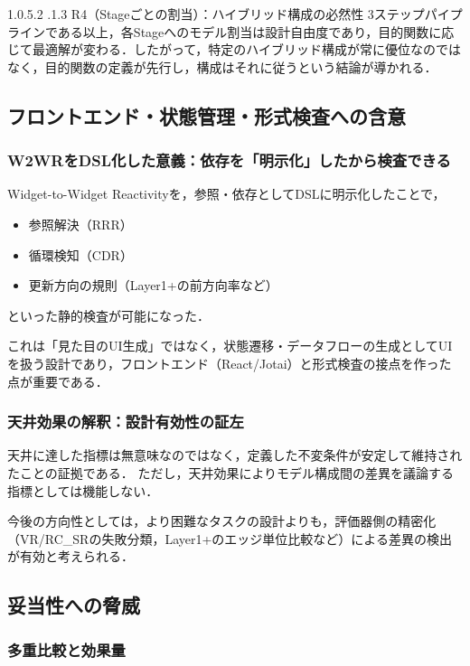 \documentclass[a4paper,10pt]{jarticle}
\makeatletter
\newcommand{\subsubsubsection}{\@startsection{paragraph}{4}{\z@}%
{1.0\Cvs \@plus.5\Cdp \@minus.2\Cdp}%
{.1\Cvs \@plus.3\Cdp}%
{\reset@font\sffamily\normalsize}
}
\makeatother
\begin{document}
\subsubsubsection{R4（Stageごとの割当）：ハイブリッド構成の必然性}
3ステップパイプラインである以上，各Stageへのモデル割当は設計自由度であり，目的関数に応じて最適解が変わる．したがって，特定のハイブリッド構成が常に優位なのではなく，目的関数の定義が先行し，構成はそれに従うという結論が導かれる．

\subsection{フロントエンド・状態管理・形式検査への含意}
\label{subsec:disc_frontend}

\subsubsection{W2WRをDSL化した意義：依存を「明示化」したから検査できる}
\label{subsubsec:disc_frontend_w2wr}

Widget-to-Widget Reactivityを，参照・依存としてDSLに明示化したことで，
\begin{itemize}
\item 参照解決（RRR）
\item 循環検知（CDR）
\item 更新方向の規則（Layer1+の前方向率など）
\end{itemize}
といった静的検査が可能になった．

これは「見た目のUI生成」ではなく，状態遷移・データフローの生成としてUIを扱う設計であり，フロントエンド（React/Jotai）と形式検査の接点を作った点が重要である．

\subsubsection{天井効果の解釈：設計有効性の証左}
\label{subsubsec:disc_frontend_ceiling}

天井に達した指標は無意味なのではなく，定義した不変条件が安定して維持されたことの証拠である．
ただし，天井効果によりモデル構成間の差異を議論する指標としては機能しない．

今後の方向性としては，より困難なタスクの設計よりも，評価器側の精密化（VR/RC\_SRの失敗分類，Layer1+のエッジ単位比較など）による差異の検出が有効と考えられる．

\subsection{妥当性への脅威}
\label{subsec:disc_threats}

\subsubsection{多重比較と効果量}
\label{subsubsec:disc_threats_stats}
\end{document}
